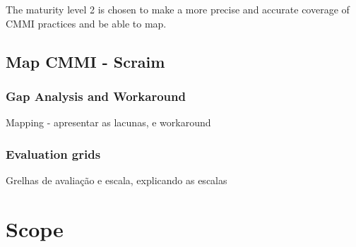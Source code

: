 The maturity level 2 is chosen to make a more precise and accurate coverage of CMMI practices and be able to map.



\subsection{Map CMMI - Scraim} \label{sec:mapping}
\subsubsection{Gap Analysis and Workaround}
	Mapping - apresentar as lacunas, e workaround
\subsubsection{Evaluation grids}
	Grelhas de avaliação e escala, explicando as escalas

\section{Scope}